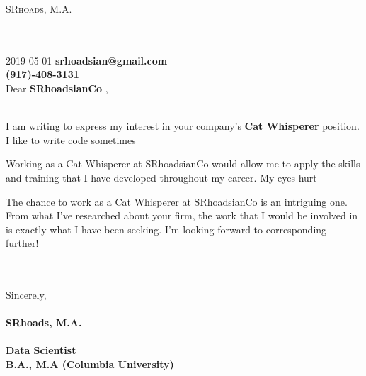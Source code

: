 \documentclass[]{formatting}\usepackage[]{graphicx}\usepackage[]{color}
\begin{document}
\colorbox{mygray}{
\parbox[t]{\linewidth}{
\vspace*{14pt} 
\hfill \color{white} \textsc{\huge 
SRhoads, M.A.
 }
\vspace*{14pt} 
}}
\large{\\ \\
2019-05-01
\hfill 
\textbf{
srhoadsian@gmail.com
} \\
}
\large{
\vspace*{14pt}
\hfill \color{white} {\textbf{\large
(917)-408-3131
}}
}
\\
\large{Dear \textbf{
SRhoadsianCo
},}
\\
\\
\large{
I am writing to express my interest in your company's \textbf{
Cat Whisperer
} position.
I like to write code sometimes
 

Working as a 
Cat Whisperer
 at
SRhoadsianCo
 would allow me to apply the skills and training that I have developed throughout my career. 
My eyes hurt










The chance to work as a 
Cat Whisperer
 at
SRhoadsianCo
 is an intriguing one. From what I’ve researched about your firm, the work that I would be involved in is exactly what I have been seeking. I'm looking forward to corresponding further!
}
\\
\\
\large{Sincerely,}\\
\\
\large{\textbf{
SRhoads, M.A.
}}\\
\\
\small{\textbf{
Data Scientist
}}\\
\small{\textbf{
B.A., M.A (Columbia University)
}}\\
\end{document}
